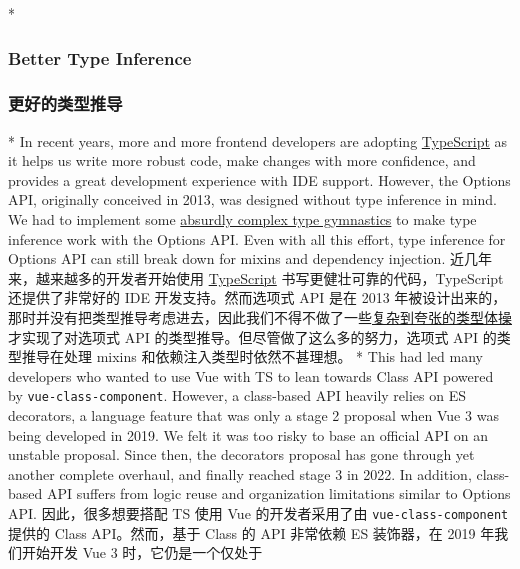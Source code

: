 \begin{paracol}{2} 
 
\switchcolumn[0]*%
\subsubsection{Better Type Inference}
\switchcolumn
\subsubsection{更好的类型推导}
\switchcolumn[0]*%
In recent years, more and more frontend developers are adopting
\href{https://www.typescriptlang.org/}{TypeScript} as it helps us write
more robust code, make changes with more confidence, and provides a
great development experience with IDE support. However, the Options API,
originally conceived in 2013, was designed without type inference in
mind. We had to implement some
\href{https://github.com/vuejs/core/blob/44b95276f5c086e1d88fa3c686a5f39eb5bb7821/packages/runtime-core/src/componentPublicInstance.ts\#L132-L165}{absurdly
complex type gymnastics} to make type inference work with the Options
API. Even with all this effort, type inference for Options API can still
break down for mixins and dependency injection.
\switchcolumn
近几年来，越来越多的开发者开始使用
\href{https://www.typescriptlang.org/}{TypeScript}
书写更健壮可靠的代码，TypeScript 还提供了非常好的 IDE
开发支持。然而选项式 API 是在 2013
年被设计出来的，那时并没有把类型推导考虑进去，因此我们不得不做了一些\href{https://github.com/vuejs/core/blob/44b95276f5c086e1d88fa3c686a5f39eb5bb7821/packages/runtime-core/src/componentPublicInstance.ts\#L132-L165}{复杂到夸张的类型体操}才实现了对选项式
API 的类型推导。但尽管做了这么多的努力，选项式 API 的类型推导在处理
mixins 和依赖注入类型时依然不甚理想。
\switchcolumn[0]*%
This had led many developers who wanted to use Vue with TS to lean
towards Class API powered by \texttt{vue-class-component}. However, a
class-based API heavily relies on ES decorators, a language feature that
was only a stage 2 proposal when Vue 3 was being developed in 2019. We
felt it was too risky to base an official API on an unstable proposal.
Since then, the decorators proposal has gone through yet another
complete overhaul, and finally reached stage 3 in 2022. In addition,
class-based API suffers from logic reuse and organization limitations
similar to Options API.
\switchcolumn
因此，很多想要搭配 TS 使用 Vue 的开发者采用了由
\texttt{vue-class-component} 提供的 Class API。然而，基于 Class 的 API
非常依赖 ES 装饰器，在 2019 年我们开始开发 Vue 3 时，它仍是一个仅处于

\end{paracol}
